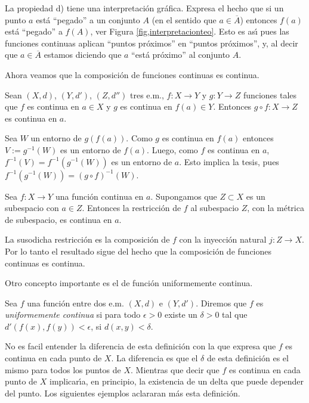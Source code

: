 La propiedad d) tiene una interpretación gráfica. Expresa el
hecho que si un punto $a$ está ``pegado'' a un conjunto $A$ (en
el sentido que $a\in \overline{A}$) entonces $f(a)$ está
``pegado'' a $f(A)$, ver Figura \ref{fig,interpretacionteo}. Esto
es as\'{\i} pues las funciones continuas aplican ``puntos
próximos'' en ``puntos próximos'', y, al decir que
$a\in\overline{A}$ estamos diciendo que $a$ ``está próximo''
al conjunto $A$.



Ahora veamos que la composición de funciones continuas es
continua.

\begin{proposicion}{} Sean $(X,d)$, $(Y,d')$, $(Z,d'')$ tres e.m.,
$f:X\rightarrow Y$ y $g:Y\rightarrow Z$ funciones tales que $f$ es
continua en $a\in X$ y $g$ es continua en $f(a)\in Y$. Entonces
$g\circ f:X\rightarrow Z$ es continua en $a$.
\end{proposicion}
\begin{demo} Sea $W$ un entorno de $g(f(a))$. Como $g$ es continua
en $f(a)$ entonces $V:=g^{-1}(W)$ es un entorno de $f(a)$. Luego,
como $f$ es continua en $a$, $f^{-1}(V)=f^{-1}(g^{-1}(W))$ es un
entorno de $a$. Esto implica la tesis, pues
$f^{-1}(g^{-1}(W))=(g\circ f)^{-1}(W)$.
\end{demo}

\begin{corolario}{} Sea $f:X\rightarrow Y$ una función continua
en $a$. Supongamos que $Z\subset X$ es un subespacio con $a\in Z$.
Entonces la restricción de $f$ al subespacio $Z$, con la
métrica de subespacio, es continua en $a$.
\end{corolario}
\begin{demo} La susodicha restricción es la composición de $f$
con la inyección natural $j:Z\rightarrow X$. Por lo tanto el
resultado sigue del hecho que la composición de funciones
continuas es continua.
\end{demo}

Otro concepto importante es el de función uniformemente
continua.

\begin{definicion}{} Sea $f$ una función entre dos e.m. $(X,d)$ e $(Y,d')$.
Diremos que $f$ es \emph{uniformemente continua} si para todo
$\epsilon>0$ existe un $\delta>0$ tal que
$d'(f(x),f(y))<\epsilon$, si $d(x,y)<\delta$.
\end{definicion}

No es facil entender la diferencia de esta definición con la que
expresa que $f$ es continua en cada punto de $X$. La diferencia es
que el $\delta$ de esta definición es el mismo para todos los
puntos de $X$. Mientras que decir que $f$ es continua en cada
punto de $X$ implicar\'{\i}a, en principio, la existencia de un
delta  que puede depender del punto. Los siguientes ejemplos
aclararan más esta definición.


